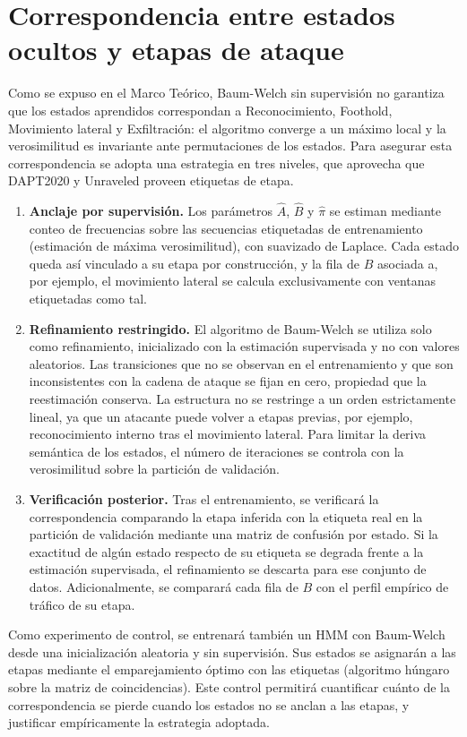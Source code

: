 \section{Correspondencia entre estados ocultos y etapas de ataque}
\label{sec:correspondencia}
Como se expuso en el Marco Teórico, Baum-Welch sin supervisión no garantiza que los estados aprendidos correspondan a Reconocimiento, Foothold, Movimiento lateral y Exfiltración: el algoritmo converge a un máximo local y la verosimilitud es invariante ante permutaciones de los estados. Para asegurar esta correspondencia se adopta una estrategia en tres niveles, que aprovecha que DAPT2020 y Unraveled proveen etiquetas de etapa.

\begin{enumerate}
    \item \textbf{Anclaje por supervisión.} Los parámetros $\hat{A}$, $\hat{B}$ y $\hat{\pi}$ se estiman mediante conteo de frecuencias sobre las secuencias etiquetadas de entrenamiento (estimación de máxima verosimilitud), con suavizado de Laplace. Cada estado queda así vinculado a su etapa por construcción, y la fila de $B$ asociada a, por ejemplo, el movimiento lateral se calcula exclusivamente con ventanas etiquetadas como tal.
    \item \textbf{Refinamiento restringido.} El algoritmo de Baum-Welch se utiliza solo como refinamiento, inicializado con la estimación supervisada y no con valores aleatorios. Las transiciones que no se observan en el entrenamiento y que son inconsistentes con la cadena de ataque se fijan en cero, propiedad que la reestimación conserva. La estructura no se restringe a un orden estrictamente lineal, ya que un atacante puede volver a etapas previas, por ejemplo, reconocimiento interno tras el movimiento lateral. Para limitar la deriva semántica de los estados, el número de iteraciones se controla con la verosimilitud sobre la partición de validación.
    \item \textbf{Verificación posterior.} Tras el entrenamiento, se verificará la correspondencia comparando la etapa inferida con la etiqueta real en la partición de validación mediante una matriz de confusión por estado. Si la exactitud de algún estado respecto de su etiqueta se degrada frente a la estimación supervisada, el refinamiento se descarta para ese conjunto de datos. Adicionalmente, se comparará cada fila de $B$ con el perfil empírico de tráfico de su etapa.
\end{enumerate}

Como experimento de control, se entrenará también un HMM con Baum-Welch desde una inicialización aleatoria y sin supervisión. Sus estados se asignarán a las etapas mediante el emparejamiento óptimo con las etiquetas (algoritmo húngaro sobre la matriz de coincidencias). Este control permitirá cuantificar cuánto de la correspondencia se pierde cuando los estados no se anclan a las etapas, y justificar empíricamente la estrategia adoptada.

